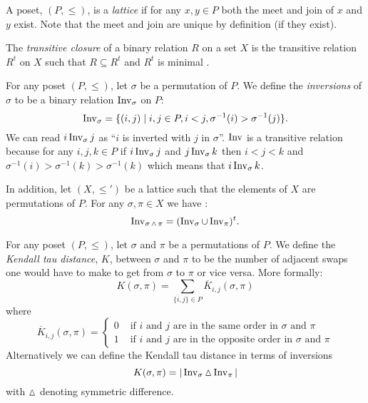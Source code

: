 	\begin{definition}
		\label{lattice-definition}
		A poset, $(P, \le)$, is a \emph{lattice} if for any $x, y \in P$ both the meet and join of $x$ and $y$ exist. Note that the meet and join are unique by definition (if they exist).
	\end{definition}

	\begin{definition}
		\label{transitive-closure-definition}
		The \emph{transitive closure} of a binary relation $R$ on a set $X$ is the transitive relation $R^t$ on $X$ such that $R \subseteq R^t$ and $R^t$ is minimal \cite[p. 337]{lidl1998applied}.
	\end{definition}

	\begin{definition}
		\label{inversion-definition}
		For any poset $(P, \le)$, let $\sigma$ be a permutation of $P$. We define the \emph{inversions} of $\sigma$ to be a binary relation $\operatorname{Inv}_{\sigma}$ on $P$:
		\[
			\operatorname{Inv}_{\sigma} = \{(i,j) \mid i, j \in P, i < j, \sigma^{-1}(i) > \sigma^{-1}(j)\}.
		\]
		We can read $i \operatorname{Inv}_{\sigma} j$ as ``$i$ is inverted with $j$ in $\sigma$''. $\operatorname{Inv}$ is a transitive relation because for any $i,j,k \in P$ if $i \operatorname{Inv}_{\sigma} j$ and $j \operatorname{Inv}_{\sigma} k$ then $i < j < k$ and $\sigma^{-1}(i) > \sigma^{-1}(k) > \sigma^{-1}(k)$ which means that $i \operatorname{Inv}_{\sigma} k$.

		In addition, let $(X, \le')$ be a lattice such that the elements of $X$ are permutations of $P$. For any $\sigma, \pi \in X$ we have \cite{markowsky1994permutation}:
		\[
			\operatorname{Inv}_{\sigma \operatorname{\wedge} \pi} = (\operatorname{Inv}_{\sigma} \cup \operatorname{Inv}_{\pi})^t.
		\]
	\end{definition}

	\begin{definition}
		\label{kendall-tau-definition}
		For any poset $(P, \le)$, let $\sigma$ and $\pi$ be a permutations of $P$. We define the \emph{Kendall tau distance}, $K$, between $\sigma$ and $\pi$ to be the number of adjacent swaps one would have to make to get from $\sigma$ to $\pi$ or vice versa. More formally:
		\[
			K(\sigma, \pi) = \sum_{\{i, j\} \in P} \overline{K}_{i, j}(\sigma, \pi)
		\]
		where
		\[
			\overline{K}_{i,j}(\sigma, \pi) =
				\begin{cases}
					0 & \textrm{ if } i \textrm{ and } j \textrm{ are in the same order in } \sigma \textrm{ and } \pi \\
					1 & \textrm{ if } i \textrm{ and } j \textrm{ are in the opposite order in } \sigma \textrm{ and } \pi
				\end{cases}
		\]
		Alternatively we can define the Kendall tau distance in terms of inversions
		\[
			K(\sigma, \pi) = |\operatorname{Inv}_{\sigma} \operatorname{\vartriangle} \operatorname{Inv}_{\pi}|
		\]
		with $\operatorname{\vartriangle}$ denoting symmetric difference.
	\end{definition}

